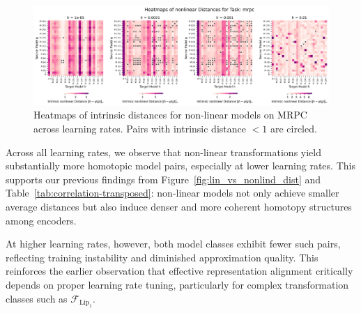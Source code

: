 \begin{figure}[H]
	\centering
	\includegraphics[width=\linewidth]{Abschlussarbeit/Pictures/heatmaps_smaller_circles/Heatmap_nonlinear_distance_all_lrs_mrpc_homotopy.png}
	\caption{Heatmaps of intrinsic distances for non-linear models on MRPC across learning rates. Pairs with intrinsic distance $<1$ are circled.}
	\label{fig:nonlin_intrinsic_model}
\end{figure}

Across all learning rates, we observe that non-linear transformations yield substantially more homotopic model pairs, especially at lower learning rates.  
This supports our previous findings from Figure~\ref{fig:lin_vs_nonlind_dist} and Table~\ref{tab:correlation-transposed}: non-linear models not only achieve smaller average distances but also induce denser and more coherent homotopy structures among encoders.

At higher learning rates, however, both model classes exhibit fewer such pairs, reflecting training instability and diminished approximation quality.  
This reinforces the earlier observation that effective representation alignment critically depends on proper learning rate tuning, particularly for complex transformation classes such as \( \mathcal{F}_{\text{Lip}_1} \).


